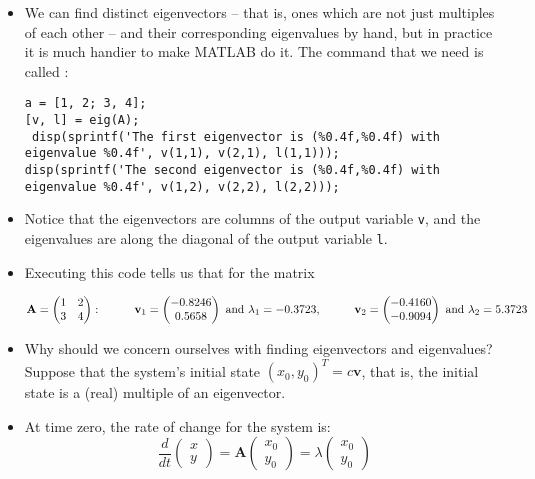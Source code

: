 \documentclass{article}
\begin{document}
\begin{itemize}
\item We can find distinct eigenvectors -- that is, ones which are not just multiples of each other -- and their corresponding eigenvalues by hand, but in practice it is much handier to make MATLAB do it. The command that we need is called :

\begin{lstlisting}
a = [1, 2; 3, 4];
[v, l] = eig(A);
 disp(sprintf('The first eigenvector is (%0.4f,%0.4f) with eigenvalue %0.4f', v(1,1), v(2,1), l(1,1)));
disp(sprintf('The second eigenvector is (%0.4f,%0.4f) with eigenvalue %0.4f', v(1,2), v(2,2), l(2,2)));
\end{lstlisting}

\item Notice that the eigenvectors are columns of the output variable \texttt{v}, and the eigenvalues are along the diagonal of the output variable \texttt{l}.

\item Executing this code tells us that for the matrix

\[ \mathbf{A} = \begin{pmatrix} 1 & 2\\ 3 & 4 \end{pmatrix}: \hspace{1 cm} \mathbf{v}_1 = \begin{pmatrix} -0.8246 \\ 0.5658\end{pmatrix} \textrm{ and } \lambda_1 = -0.3723, \hspace{1 cm} \mathbf{v}_2 = \begin{pmatrix}  -0.4160 \\ -0.9094 \end{pmatrix} \textrm{ and } \lambda_2 = 5.3723\]

\item Why should we concern ourselves with finding eigenvectors and eigenvalues? Suppose that the system's initial state $(x_0,y_0)^T=c\mathbf{v}$, that is, the initial state is a (real) multiple of an eigenvector.

\item At time zero, the rate of change for the system is:
\[ \frac{d}{dt} \begin{pmatrix} x\\y \end{pmatrix} = \mathbf{A} \begin{pmatrix} x_0\\y_0 \end{pmatrix} = \lambda \begin{pmatrix} x_0\\y_0 \end{pmatrix} \]


\end{itemize}
\end{document}
